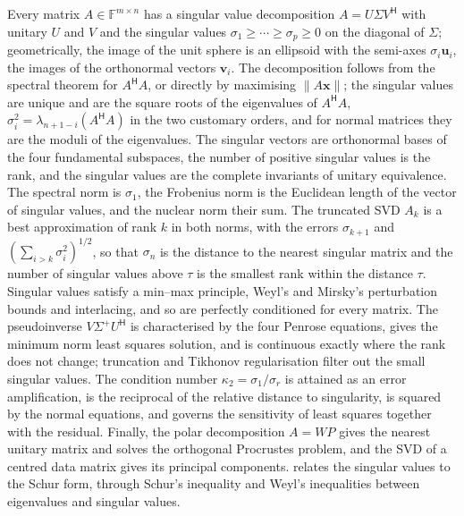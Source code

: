 \bigskip
Every matrix $A\in\mathbb F^{m\times n}$ has a singular value decomposition $A=U\Sigma V^{\mathsf H}$ with unitary $U$ and $V$ and the singular values $\sigma_1\ge\cdots\ge\sigma_p\ge0$ on the diagonal of $\Sigma$; geometrically, the image of the unit sphere is an ellipsoid with the semi-axes $\sigma_i\mathbf u_i$, the images of the orthonormal vectors $\mathbf v_i$. The decomposition follows from the spectral theorem for $A^{\mathsf H}A$, or directly by maximising $\|A\mathbf x\|$; the singular values are unique and are the square roots of the eigenvalues of $A^{\mathsf H}A$, $\sigma_i^2=\lambda_{n+1-i}(A^{\mathsf H}A)$ in the two customary orders, and for normal matrices they are the moduli of the eigenvalues. The singular vectors are orthonormal bases of the four fundamental subspaces, the number of positive singular values is the rank, and the singular values are the complete invariants of unitary equivalence. The spectral norm is $\sigma_1$, the Frobenius norm is the Euclidean length of the vector of singular values, and the nuclear norm their sum. The truncated SVD $A_k$ is a best approximation of rank $k$ in both norms, with the errors $\sigma_{k+1}$ and $(\sum_{i>k}\sigma_i^2)^{1/2}$, so that $\sigma_n$ is the distance to the nearest singular matrix and the number of singular values above $\tau$ is the smallest rank within the distance $\tau$. Singular values satisfy a min--max principle, Weyl's and Mirsky's perturbation bounds and interlacing, and so are perfectly conditioned for every matrix. The pseudoinverse $V\Sigma^+U^{\mathsf H}$ is characterised by the four Penrose equations, gives the minimum norm least squares solution, and is continuous exactly where the rank does not change; truncation and Tikhonov regularisation filter out the small singular values. The condition number $\kappa_2=\sigma_1/\sigma_r$ is attained as an error amplification, is the reciprocal of the relative distance to singularity, is squared by the normal equations, and governs the sensitivity of least squares together with the residual. Finally, the polar decomposition $A=WP$ gives the nearest unitary matrix and solves the orthogonal Procrustes problem, and the SVD of a centred data matrix gives its principal components.  relates the singular values to the Schur form, through Schur's inequality and Weyl's inequalities between eigenvalues and singular values.

\chapternotes

